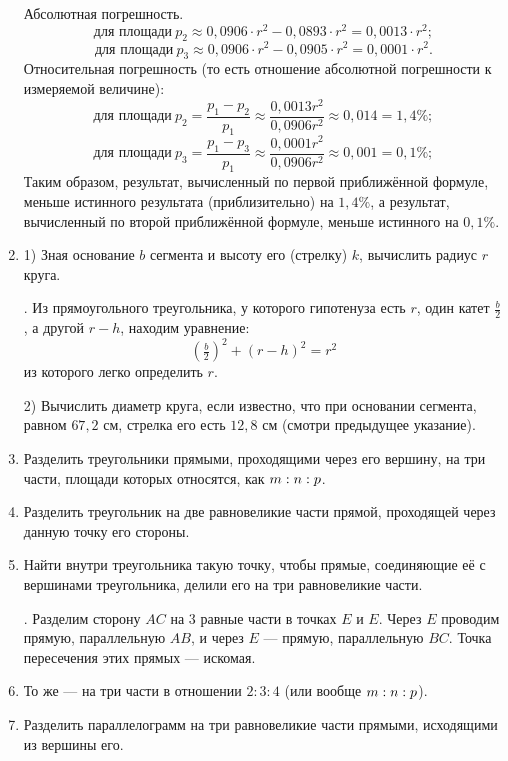 \documentclass[oneside]{book}
\begin{document}
\begin{enumerate}[resume]
Абсолютная погрешность.
\[\text{для площади}~p_2 \approx 0{,}0906\cdot r^2 - 0{,}0893\cdot r^2 = 0{,}0013\cdot r^2;\]
\[\text{для площади}~p_3 \approx 0{,}0906\cdot r^2 - 0{,}0905\cdot r^2 = 0{,}0001\cdot r^2.\]
Относительная погрешность (то есть отношение абсолютной погрешности к измеряемой величине):
\[\text{для площади}~p_2 = \frac{p_1-p_2}{p_1}\approx\frac{0{,}0013r^2}{0{,}0906r^2}\approx0{,}014 = 1{,}4\%;\]
\[\text{для площади}~p_3 = \frac{p_1-p_3}{p_1}\approx\frac{0{,}0001r^2}{0{,}0906r^2}\approx0{,}001 = 0{,}1\%;\]
Таким образом, результат, вычисленный по первой приближённой формуле, меньше истинного результата (приблизительно) на $1{,}4\%$, а результат, вычисленный по второй приближённой формуле, меньше истинного на $0{,}1\%$.

 \item
1) Зная основание $b$ сегмента и высоту его (стрелку) $k$, вычислить радиус $r$ круга.

\smallskip
{}.
Из прямоугольного треугольника, у которого гипотенуза есть $r$, один катет $\frac b2$, а другой $r-h$, находим уравнение:
\[(\tfrac b2)^2+(r-h)^2=r^2\]
из которого легко определить $r$.

2) Вычислить диаметр круга, если известно, что при основании сегмента, равном $67{,}2$ см, стрелка его есть $12{,}8$ см (смотри предыдущее указание).

\smallskip
{}

 \item
Разделить треугольники прямыми, проходящими через его вершину, на три части, площади которых относятся, как $m\z:n:p$.

 \item
Разделить треугольник на две равновеликие части прямой, проходящей через данную точку его стороны.

 \item
Найти внутри треугольника такую точку, чтобы прямые, соединяющие её с вершинами треугольника, делили его на три равновеликие части.

\smallskip
{}.
Разделим сторону $AC$ на $3$ равные части в точках $E$ и $E$.
Через $E$ проводим прямую, параллельную $AB$, и через $E$ — прямую, параллельную $BC$.
Точка пересечения этих прямых — искомая.

 \item
То же — на три части в отношении $2:3:4$ (или вообще $m:n\z:p$).

 \item
Разделить параллелограмм на три равновеликие части прямыми, исходящими из вершины его.


\end{enumerate}
\end{document}
